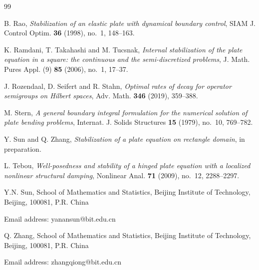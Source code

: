 \documentclass[twoside]{article}
\theoremstyle{noparens}
\theoremstyle{definition}
\numberwithin{equation}{section}
\numberwithin{figure}{section}
\begin{document}
\begin{thebibliography}{99}
{ B. Rao, {\it Stabilization of an elastic plate with dynamical boundary control}, SIAM J. Control Optim. {\bf 36} (1998), no.~1, 148--163.


 K. Ramdani, T. Takahashi and M. Tucsnak, {\it Internal stabilization of the plate equation in a square: the continuous and the semi-discretized problems}, J. Math. Pures Appl. (9) {\bf 85} (2006), no.~1, 17--37.

 J. Rozendaal, D. Seifert and R. Stahn, {\it Optimal rates of decay for operator semigroups on Hilbert spaces}, Adv. Math. {\bf 346} (2019), 359--388.

 M. Stern, {\it A general boundary integral formulation for the numerical solution of plate bending problems}, Internat. J. Solids Structures {\bf 15} (1979), no.~10, 769--782.

 Y. Sun and Q. Zhang, {\it Stabilization of a plate equation on rectangle domain}, in preparation.

 L. Tebou, {\it Well-posedness and stability of a hinged plate equation with a localized nonlinear structural damping}, Nonlinear Anal. {\bf 71} (2009), no.~12, 2288--2297.

}

\end{thebibliography}

Y.N. Sun, School of Mathematics and Statistics, Beijing Institute of Technology, Beijing, 100081, P.R. China

Email address: yanansun@bit.edu.cn

Q. Zhang, 
School of Mathematics and Statistics, Beijing Institute of Technology, Beijing, 100081, P.R. China

Email address: zhangqiong@bit.edu.cn
\end{document}
